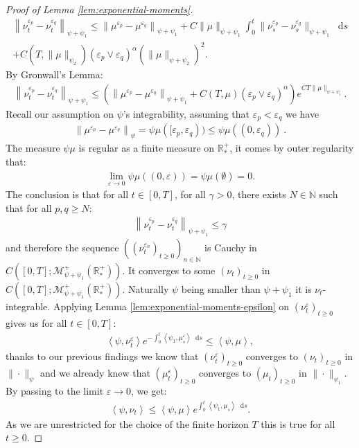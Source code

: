 \documentclass[11pt,a4paper]{article}
\newcommand{\NN}{\mathbb{N}}
\newcommand{\RRP}{\mathbb{R}^+_*}
\newcommand{\MC}{\mathcal{M}}
\newcommand{\Proc}[1]{\left(#1\right)_{t\geq 0}}
\newcommand{\Seq}[1]{\left(#1\right)_{n\in \mathbb{N}}}
\newcommand{\brac}[1]{\left\langle#1\right\rangle}
\newcommand{\dd}{\mathop{}\!\mathrm{d}}
\begin{document}
\begin{proof}[Proof of Lemma \ref{lem:exponential-moments}]
    \begin{multline*}
        \left\| \nu_t^{\varepsilon_p}-\nu_t^{\varepsilon_q}\right\|_{\psi + \psi_1} \leq  \left\| \mu^{\varepsilon_p} - \mu^{\varepsilon_q}\right\|_{\psi + \psi_1} + C\|\mu\|_{\psi + \psi_1}\int_0^t \|\nu_s^{\varepsilon_p}-\nu_s^{\varepsilon_q}\|_{\psi + \psi_1}\dd s \\
        + C\left(T,\|\mu\|_{\psi_2}\right)\left(\varepsilon_p \vee \varepsilon_q \right)^{\alpha} \left(\|\mu\|_{\psi + \psi_2}\right)^2.
    \end{multline*}
    By Gronwall's Lemma:
    \begin{align*}
        \left\| \nu_t^{\varepsilon_p}-\nu_t^{\varepsilon_q}\right\|_{\psi + \psi_1} \leq \left( \left\| \mu^{\varepsilon_p} - \mu^{\varepsilon_q}\right\|_{\psi + \psi_1} + C\left(T,\mu\right)\left(\varepsilon_p \vee \varepsilon_q \right)^{\alpha} \right) e^{CT\|\mu \|_{\psi + \psi_1}}.
    \end{align*}
    Recall our assumption on $\psi$'s integrability, assuming that $\varepsilon_p < \varepsilon_q$ we have
    \begin{align*}
        \left\| \mu^{\varepsilon_p} - \mu^{\varepsilon_q}\right\|_{\psi} = \psi\mu([\varepsilon_p,\varepsilon_q)) \leq \psi\mu\left((0,\varepsilon_q) \right)\ .
    \end{align*}
    The measure $\psi\mu$ is regular as a finite measure on $\RRP$, it comes by outer regularity that:
    \begin{align*}
        \lim\limits_{\varepsilon \to 0} \psi\mu\left((0,\varepsilon)\right) = \psi\mu(\emptyset) = 0.
    \end{align*}
    The conclusion is that for all $t \in [0,T]$, for all $\gamma > 0$, there exists $N \in \NN$ such that for all $p,q \geq N$:
    \begin{align*}
        \left\| \nu_t^{\varepsilon_p}-\nu_t^{\varepsilon_q}\right\|_{\psi + \psi_1} \leq \gamma
    \end{align*}
    and therefore the sequence $\Seq{\Proc{\nu^{\varepsilon_n}_t}}$ is Cauchy in $C([0,T];\MC^+_{\psi + \psi_1}(\RRP))$. It converges to some $\Proc{\nu_t}$ in $C([0,T];\MC^+_{\psi + \psi_1}(\RRP))$. Naturally $\psi$ being smaller than $\psi + \psi_1$ it is $\nu_t$-integrable. Applying Lemma \ref{lem:exponential-moments-epsilon} on $\Proc{\nu^\varepsilon_t}$ gives us for all $t \in [0,T]$:
    \begin{align*}
        \brac{\psi,\nu^\varepsilon_t}e^{-\int_0^t \brac{\psi_1,\mu^\varepsilon_s}\dd s} \leq \brac{\psi,\mu},
    \end{align*}
    thanks to our previous findings we know that $\Proc{\nu_t^\varepsilon}$ converges to $\Proc{\nu_t}$ in $\|\cdot\|_{\psi}$ and we already knew that $\Proc{\mu^\varepsilon_t}$ converges to $\Proc{\mu_t}$ in $\|\cdot\|_{\psi_1}$. By passing to the limit $\varepsilon \to 0$, we get:
    \begin{align*}
        \brac{\psi,\nu_t} \leq  \brac{\psi,\mu} e^{\int_0^t \brac{\psi_1,\mu_s}\dd s}.
    \end{align*}
    As we are unrestricted for the choice of the finite horizon $T$ this is true for all $t \geq 0$. 
    

\end{proof}
\end{document}

